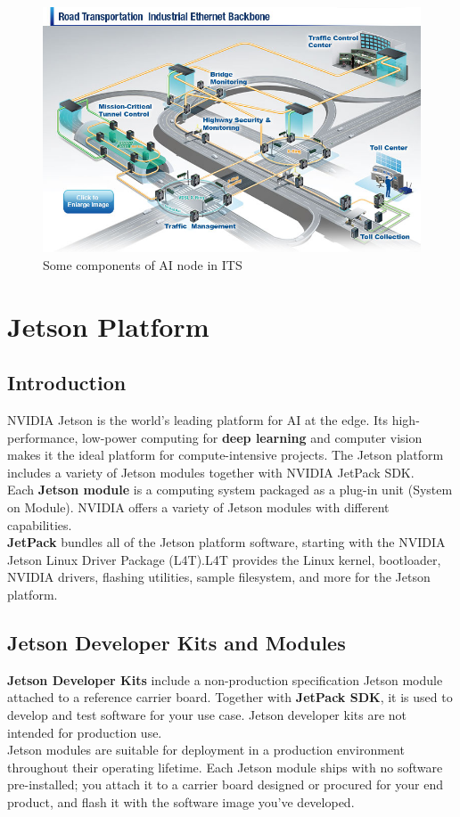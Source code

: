     \begin{figure}[H]
        \centering
        \includegraphics[width=0.6\linewidth]{img/ITS.png}
        \caption{Some components of AI node in ITS}
    \end{figure}

\section{Jetson Platform}

    \subsection{Introduction}
        NVIDIA \textregistered Jetson \texttrademark is the world's leading platform for AI at the edge. 
        Its high-performance, low-power computing for \textbf{deep learning} and computer vision makes it the ideal 
        platform for compute-intensive projects. The Jetson platform includes a variety of Jetson modules 
        together with NVIDIA JetPack \texttrademark SDK. \\ 
        \vspace{3mm}
        Each \textbf{Jetson module} is a computing system packaged as a plug-in unit (System on Module). NVIDIA offers a 
        variety of Jetson modules with different capabilities. \\ 
        \vspace{3mm}
        \textbf{JetPack} bundles all of the Jetson platform software, starting with the NVIDIA \textregistered Jetson \texttrademark 
        Linux Driver Package (L4T).L4T provides the Linux kernel, bootloader, NVIDIA drivers, flashing utilities, sample filesystem, 
        and more for the Jetson platform.
    \subsection{Jetson Developer Kits and Modules}
        \textbf{Jetson Developer Kits} include a non-production specification Jetson module attached to a reference carrier board. 
        Together with \textbf{JetPack SDK}, it is used to develop and test software for your use case. Jetson developer kits are not intended 
        for production use. \\ 
        \vspace{3mm}
        Jetson modules are suitable for deployment in a production environment throughout their operating lifetime. Each Jetson module ships 
        with no software pre-installed; you attach it to a carrier board designed or procured for your end product, and flash it with the software 
        image you’ve developed.
